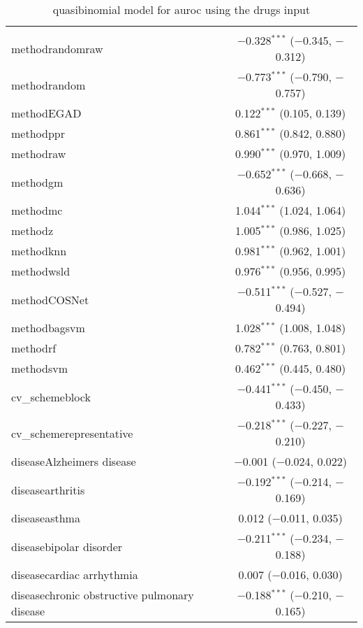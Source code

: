
\begin{table}[!htbp] \centering 
  \caption{quasibinomial model for auroc using the drugs input} 
  \label{} 
\begin{tabular}{@{\extracolsep{5pt}}lc} 
\\[-1.8ex]\hline 
\hline \\[-1.8ex] 
 methodrandomraw & $-$0.328$^{***}$ ($-$0.345, $-$0.312) \\ 
  methodrandom & $-$0.773$^{***}$ ($-$0.790, $-$0.757) \\ 
  methodEGAD & 0.122$^{***}$ (0.105, 0.139) \\ 
  methodppr & 0.861$^{***}$ (0.842, 0.880) \\ 
  methodraw & 0.990$^{***}$ (0.970, 1.009) \\ 
  methodgm & $-$0.652$^{***}$ ($-$0.668, $-$0.636) \\ 
  methodmc & 1.044$^{***}$ (1.024, 1.064) \\ 
  methodz & 1.005$^{***}$ (0.986, 1.025) \\ 
  methodknn & 0.981$^{***}$ (0.962, 1.001) \\ 
  methodwsld & 0.976$^{***}$ (0.956, 0.995) \\ 
  methodCOSNet & $-$0.511$^{***}$ ($-$0.527, $-$0.494) \\ 
  methodbagsvm & 1.028$^{***}$ (1.008, 1.048) \\ 
  methodrf & 0.782$^{***}$ (0.763, 0.801) \\ 
  methodsvm & 0.462$^{***}$ (0.445, 0.480) \\ 
  cv\_schemeblock & $-$0.441$^{***}$ ($-$0.450, $-$0.433) \\ 
  cv\_schemerepresentative & $-$0.218$^{***}$ ($-$0.227, $-$0.210) \\ 
  diseaseAlzheimers disease & $-$0.001 ($-$0.024, 0.022) \\ 
  diseasearthritis & $-$0.192$^{***}$ ($-$0.214, $-$0.169) \\ 
  diseaseasthma & 0.012 ($-$0.011, 0.035) \\ 
  diseasebipolar disorder & $-$0.211$^{***}$ ($-$0.234, $-$0.188) \\ 
  diseasecardiac arrhythmia & 0.007 ($-$0.016, 0.030) \\ 
  diseasechronic obstructive pulmonary disease & $-$0.188$^{***}$ ($-$0.210, $-$0.165) \\ 

\end{tabular}
\end{table}
